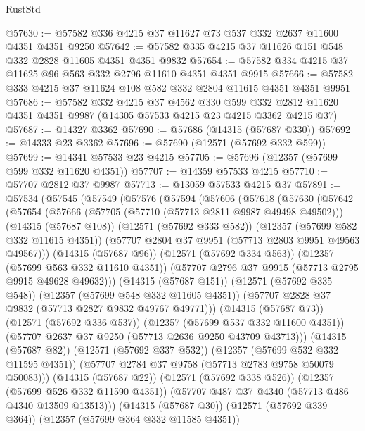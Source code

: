 \begin{lexlean}{RustStd}
\begin{coremodule}
@57630 := @57582 @336 @4215 @37 @11627 @73 @537 @332 @2637 @11600 @4351 @4351 @9250
@57642 := @57582 @335 @4215 @37 @11626 @151 @548 @332 @2828 @11605 @4351 @4351 @9832
@57654 := @57582 @334 @4215 @37 @11625 @96 @563 @332 @2796 @11610 @4351 @4351 @9915
@57666 := @57582 @333 @4215 @37 @11624 @108 @582 @332 @2804 @11615 @4351 @4351 @9951
@57686 := @57582
    @332
    @4215
    @37
    @4562
    @330
    @599
    @332
    @2812
    @11620
    @4351
    @4351
    @9987
    (@14305 @57533 @4215 @23 @4215 @3362 @4215 @37)
@57687 := @14327 @3362
@57690 := @57686 (@14315 (@57687 @330))
@57692 := @14333 @23 @3362
@57696 := @57690 (@12571 (@57692 @332 @599))
@57699 := @14341 @57533 @23 @4215
@57705 := @57696 (@12357 (@57699 @599 @332 @11620 @4351))
@57707 := @14359 @57533 @4215
@57710 := @57707 @2812 @37 @9987
@57713 := @13059 @57533 @4215 @37
@57891 := @57534
    (@57545
      (@57549
        (@57576
          (@57594
            (@57606
              (@57618
                (@57630
                  (@57642
                    (@57654
                      (@57666
                        (@57705 (@57710 (@57713 @2811 @9987 @49498 @49502)))
                        (@14315 (@57687 @108))
                        (@12571 (@57692 @333 @582))
                        (@12357 (@57699 @582 @332 @11615 @4351))
                        (@57707 @2804 @37 @9951 (@57713 @2803 @9951 @49563 @49567)))
                      (@14315 (@57687 @96))
                      (@12571 (@57692 @334 @563))
                      (@12357 (@57699 @563 @332 @11610 @4351))
                      (@57707 @2796 @37 @9915 (@57713 @2795 @9915 @49628 @49632)))
                    (@14315 (@57687 @151))
                    (@12571 (@57692 @335 @548))
                    (@12357 (@57699 @548 @332 @11605 @4351))
                    (@57707 @2828 @37 @9832 (@57713 @2827 @9832 @49767 @49771)))
                  (@14315 (@57687 @73))
                  (@12571 (@57692 @336 @537))
                  (@12357 (@57699 @537 @332 @11600 @4351))
                  (@57707 @2637 @37 @9250 (@57713 @2636 @9250 @43709 @43713)))
                (@14315 (@57687 @82))
                (@12571 (@57692 @337 @532))
                (@12357 (@57699 @532 @332 @11595 @4351))
                (@57707 @2784 @37 @9758 (@57713 @2783 @9758 @50079 @50083)))
              (@14315 (@57687 @22))
              (@12571 (@57692 @338 @526))
              (@12357 (@57699 @526 @332 @11590 @4351))
              (@57707 @487 @37 @4340 (@57713 @486 @4340 @13509 @13513)))
            (@14315 (@57687 @30))
            (@12571 (@57692 @339 @364))
            (@12357 (@57699 @364 @332 @11585 @4351))

\end{coremodule}
\end{lexlean}
